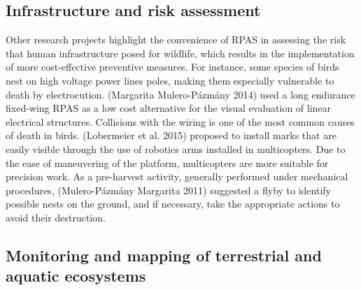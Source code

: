 \documentclass[]{interact}
\theoremstyle{plain}%
\theoremstyle{definition}
\theoremstyle{remark}
\begin{document}


\subsection{Infrastructure and risk
assessment}\label{infrastructure-and-risk-assessment}

Other research projects highlight the convenience of RPAS in assessing
the risk that human infrastructure posed for wildlife, which results in
the implementation of more cost-effective preventive measures. For
instance, some species of birds nest on high voltage power lines poles,
making them especially vulnerable to death by electrocution. (Margarita
Mulero-Pázmány 2014) used a long endurance fixed-wing RPAS as a low cost
alternative for the visual evaluation of linear electrical structures.
Collisions with the wiring is one of the most common causes of death in
birds. (Lobermeier et al. 2015) proposed to install marks that are
easily visible through the use of robotics arms installed in
multicopters. Due to the ease of maneuvering of the platform,
multicopters are more suitable for precision work. As a pre-harvest
activity, generally performed under mechanical procedures,
(Mulero-Pázmány Margarita 2011) suggested a flyby to identify possible
nests on the ground, and if necessary, take the appropriate actions to
avoid their destruction.

\subsection{Monitoring and mapping of terrestrial and aquatic
ecosystems}\label{monitoring-and-mapping-of-terrestrial-and-aquatic-ecosystems}
\end{document}
